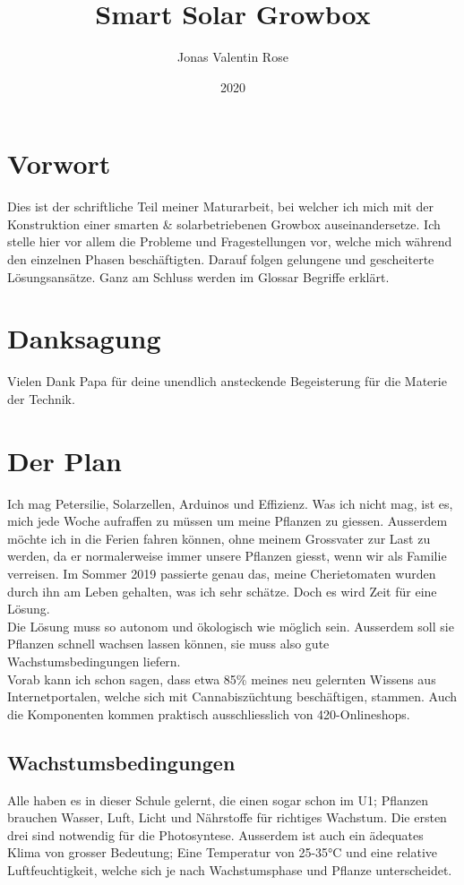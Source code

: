 \documentclass[12pt,titlepage,a4paper]{article}
\begin{document}
\begin{titlepage}
\title{Smart Solar Growbox}
\date{2020}
\author{Jonas Valentin Rose}
\end{titlepage}
\maketitle 
\tableofcontents
\newpage
\section{Vorwort}
Dies ist der schriftliche Teil meiner Maturarbeit, bei welcher ich mich  mit der Konstruktion einer smarten \& solarbetriebenen Growbox auseinandersetze. Ich stelle hier vor allem die Probleme und Fragestellungen vor, welche mich während den einzelnen Phasen beschäftigten. Darauf folgen gelungene und gescheiterte Lösungsansätze. Ganz am Schluss werden im Glossar Begriffe erklärt.

\section{Danksagung}
Vielen Dank Papa für deine unendlich ansteckende Begeisterung für die Materie der Technik.
\section{Der Plan}
Ich mag Petersilie, Solarzellen, Arduinos und Effizienz. Was ich nicht mag, ist es, mich jede Woche aufraffen zu müssen um meine Pflanzen zu giessen. Ausserdem möchte ich in die Ferien fahren können, ohne meinem Grossvater zur Last zu werden, da er normalerweise immer unsere Pflanzen giesst, wenn wir als Familie verreisen. Im Sommer 2019 passierte genau das, meine Cherietomaten wurden durch ihn am Leben gehalten, was ich sehr schätze. Doch es wird Zeit für eine Lösung. \\Die Lösung muss so autonom und ökologisch wie möglich sein. Ausserdem soll sie Pflanzen schnell wachsen lassen können, sie muss also gute Wachstumsbedingungen liefern. \\ Vorab kann ich schon sagen, dass etwa 85\% meines neu gelernten Wissens aus Internetportalen, welche sich mit Cannabiszüchtung beschäftigen, stammen. Auch die Komponenten kommen praktisch ausschliesslich von 420-Onlineshops. 
\subsection{Wachstumsbedingungen}
Alle haben es in dieser Schule gelernt, die einen sogar schon im U1; Pflanzen brauchen Wasser, Luft, Licht und Nährstoffe für richtiges Wachstum. Die ersten drei sind notwendig für die Photosyntese. Ausserdem ist auch ein ädequates Klima von grosser Bedeutung; Eine Temperatur von 25-35°C und eine relative Luftfeuchtigkeit, welche sich je nach Wachstumsphase und Pflanze unterscheidet.
\end{document}

